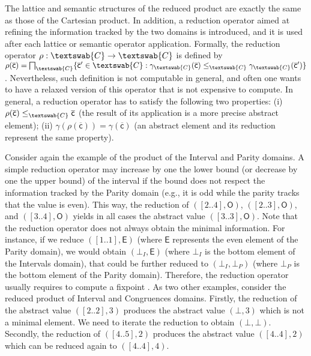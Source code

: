 \documentclass[submission,copyright,creativecommons]{eptcs}
\newcommand{\funzione}[2]{\ensuremath{#1 \rightarrow#2}}
\newcommand{\cel}[1]{\ensuremath{\mathsf{#1}}}
\newcommand{\ael}[1]{\cel{\overline{#1}}}
\newcommand{\cartesiandomain}{\textswab{C}}
\begin{document}
The lattice and semantic structures of the reduced product are exactly the same as those of the Cartesian product. In addition, a reduction operator aimed at refining the information tracked by the two domains is introduced, and it is used after each lattice or semantic operator application. Formally, the reduction operator $\rho : \funzione{\cartesiandomain}{\cartesiandomain}$ is defined by $\rho(\ael{c})=\bigsqcap_\cartesiandomain \{ \ael{c}' \in \cartesiandomain : \gamma_{\cartesiandomain}(\ael{c}) \leq_{\cartesiandomain} \gamma_{\cartesiandomain}(\ael{c}') \}$. Nevertheless, such definition is not computable in general, and often one wants to have a relaxed version of this operator that is not expensive to compute. In general, a reduction operator has to satisfy the following two properties: (i) $\rho(\ael{c}) \leq_\cartesiandomain \ael{c}$ (the result of its application is a more precise abstract element); (ii) $\gamma(\rho(\ael{c})) = \gamma(\ael{c})$ (an abstract element and its reduction represent the same property).

Consider again the example of the product of the Interval and Parity domains. A simple reduction operator may increase by one the lower bound (or decrease by one the upper bound) of the interval if the bound does not respect the information tracked by the Parity domain (e.g., it is odd while the parity tracks that the value is even). This way, the reduction of $([2..4], \cel{O})$, $([2..3], \cel{O})$, and $([3..4], \cel{O})$ yields in all cases the abstract value $([3..3], \cel{O})$. Note that the reduction operator does not always obtain the minimal information. For instance, if we reduce $([1..1], \cel{E})$ (where $\cel{E}$ represents the even element of the Parity domain), we would obtain $(\bot_I, \cel{E})$ (where $\bot_I$ is the bottom element of the Intervals domain), that could be further reduced to $(\bot_I, \bot_P)$ (where $\bot_P$ is the bottom element of the Parity domain). Therefore, the reduction operator usually requires to compute a fixpoint \cite{MIT}. 
As two other examples, consider the reduced product of Interval and Congruences domains. Firstly, the reduction of the abstract value $([2..2],3)$ produces the abstract value $(\bot,3)$ which is not a minimal element. We need to iterate the reduction to obtain $(\bot,\bot)$. Secondly, the reduction of $([4..5],2)$ produces the abstract value $([4..4],2)$ which can be reduced again to $([4..4],4)$.
\end{document}
